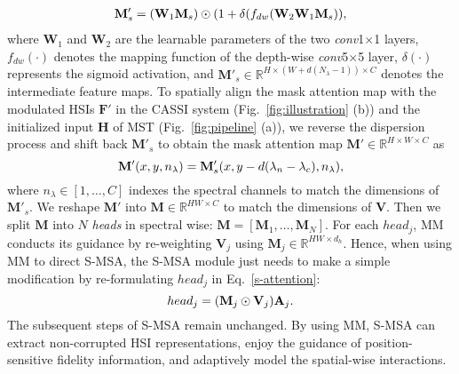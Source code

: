 \documentclass[10pt,twocolumn,letterpaper]{article}
\begin{document}
\vspace{-1.1mm}
\begin{equation}
\begin{aligned}
\mathbf{M}'_s = (\mathbf{W}_1\mathbf{M}_s)\odot(1+\delta(f_{dw}(\mathbf{W}_2\mathbf{W}_1\mathbf{M}_s)),
\end{aligned}
\vspace{-1.3mm}
\end{equation}
where $\mathbf{W}_1$ and $\mathbf{W}_2$ are the learnable parameters of the two \emph{conv}1$\times$1 layers, $f_{dw}(\cdot)$ denotes the mapping function of the depth-wise \emph{conv}5$\times$5 layer, $\delta(\cdot)$ represents the sigmoid activation, and $\mathbf{M}'_s \in \mathbb{R}^{H\times (W+d(N_{\lambda}-1))\times C}$ denotes the intermediate feature maps. To spatially align the mask attention map with the modulated HSIs $\mathbf{F}'$ in the CASSI system (Fig.~\ref{fig:illustration} (b)) and the initialized input $\mathbf{H}$ of MST (Fig.~\ref{fig:pipeline} (a)), we reverse the dispersion process and shift back $\mathbf{M}'_s$ to obtain the mask attention map $\mathbf{M}' \in \mathbb{R}^{H\times W \times C}$ as
\vspace{-1.0mm}
\begin{equation}
\mathbf{M}'(x,y,n_\lambda) = \mathbf{M}'_s(x,y-d(\lambda_n-\lambda_c),n_\lambda),
\vspace{-1.4mm}
\label{shift_back_mask}
\end{equation}
where $n_{\lambda} \in [1,\dots, C]$ indexes the spectral channels to match the dimensions of $\mathbf{M}'_s$. We reshape $\mathbf{M}'$ into $\mathbf{M} \in \mathbb{R}^{HW \times C}$ to match the dimensions of $\mathbf{V}$. Then we split $\mathbf{M}$ into $N$ \emph{heads} in spectral wise: $\mathbf{M} = [\mathbf{M}_1,\ldots,\mathbf{M}_N]$. For each $head_j$, MM conducts its guidance by re-weighting $\mathbf{V}_j$ using $\mathbf{M}_j \in \mathbb{R}^{HW \times d_h}$. Hence, when using MM to direct S-MSA, the S-MSA module just needs to make a simple modification by re-formulating $head_j$ in Eq.~\eqref{s-attention}:
\vspace{-1.2mm}
\begin{equation}
{head}_j  = (\mathbf{M}_j \odot \mathbf{V}_j) \mathbf{A}_j.
\vspace{-1.2mm}
\label{s-attention_mask}
\end{equation}
The subsequent steps of S-MSA remain unchanged. By using MM, S-MSA can extract non-corrupted HSI representations, enjoy the guidance of position-sensitive fidelity information, and adaptively model the spatial-wise interactions.
\end{document}
